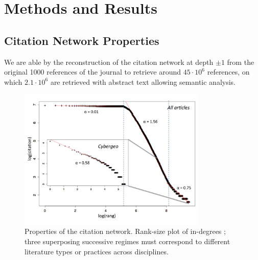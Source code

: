 \section{Methods and Results}
\label{sec:results}



\subsection{Citation Network Properties}


We are able by the reconstruction of the citation network at depth $\pm 1$ from the original 1000 references of the journal to retrieve around $45\cdot 10^6$ references, on which $2.1\cdot 10^6$ are retrieved with abstract text allowing semantic analysis. 




\begin{figure}
\centering
\includegraphics[width=0.8\textwidth]{figures/ranksize.pdf}
\caption[Properties of the citation network]{Properties of the citation network. Rank-size plot of in-degrees ; three superposing successive regimes must correspond to different literature types or practices across disciplines.}
\label{fig:quantepistemo:citnw}
\end{figure}


